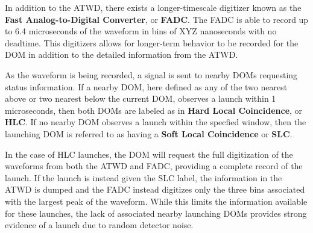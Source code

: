 In addition to the ATWD, there exists a longer-timescale digitizer known as the \textbf{Fast Analog-to-Digital Converter}, or \textbf{FADC}. 
The FADC is able to record up to 6.4 microseconds of the waveform in bins of XYZ nanoseconds with no deadtime.
This digitizers allows for longer-term behavior to be recorded for the DOM in addition to the detailed information from the ATWD.

As the waveform is being recorded, a signal is sent to nearby DOMs requesting status information.
If a nearby DOM, here defined as any of the two nearest above or two nearest below the current DOM, observes a launch within 1 microseconds, then both DOMs are labeled as in \textbf{Hard Local Coincidence}, or \textbf{HLC}.
If no nearby DOM observes a launch within the specfied window, then the launching DOM is referred to as having a \textbf{Soft Local Coincidence} or \textbf{SLC}.

In the case of HLC launches, the DOM will request the full digitization of the waveforms from both the ATWD and FADC, providing a complete record of the launch.
If the launch is instead given the SLC label, the information in the ATWD is dumped and the FADC instead digitizes only the three bins associated with the largest peak of the waveform.
While this limits the information available for these launches, the lack of associated nearby launching DOMs provides strong evidence of a launch due to random detector noise.
